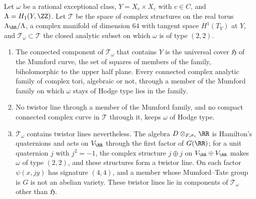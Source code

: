 \begin{proposition}\label{prop:notwistor}
Let $\omega$ be a rational exceptional class, $Y=X_{c}\times X_{c}$ with
$c\in C$, and $\Lambda=H_{1}(Y,\ZZ)$. Let $\mathcal{T}$ be the space of
complex structures on the real torus $\Lambda_{\RR}/\Lambda$, a complex
manifold of dimension $64$ with tangent space $H^{1}(T_{Y})$ at $Y$, and
$\mathcal{T}_{\omega}\subset\mathcal{T}$ the closed analytic subset on which
$\omega$ is of type $(2,2)$.
\begin{enumerate}[label=\textup{(\roman*)},leftmargin=2.6em,itemsep=2pt]
\item The connected component of $\mathcal{T}_{\omega}$ that contains $Y$ is
  the universal cover $\mathfrak{H}$ of the Mumford curve, the set of
  squares of members of the family, biholomorphic to the upper half plane.
  Every connected complex analytic family of complex tori, algebraic or not,
  through a member of the Mumford family on which $\omega$ stays of Hodge
  type lies in the family.
\item No twistor line through a member of the Mumford family, and no compact
  connected complex curve in $\mathcal{T}$ through it, keeps $\omega$ of
  Hodge type.
\item $\mathcal{T}_{\omega}$ contains twistor lines nevertheless. The algebra
  $D\otimes_{F,\sigma_{1}}\RR$ is Hamilton's quaternions and acts on
  $V_{\RR}$ through the first factor of $G(\RR)$; for a unit quaternion $j$
  with $j^{2}=-1$, the complex structure $j\oplus j$ on $V_{\RR}\oplus
  V_{\RR}$ makes $\omega$ of type $(2,2)$, and these structures form a twistor
  line. On each factor $\psi(x,jy)$ has signature $(4,4)$, and a member whose
  Mumford--Tate group is $G$ is not an abelian variety. These twistor lines
  lie in components of $\mathcal{T}_{\omega}$ other than $\mathfrak{H}$.
\end{enumerate}
\end{proposition}

